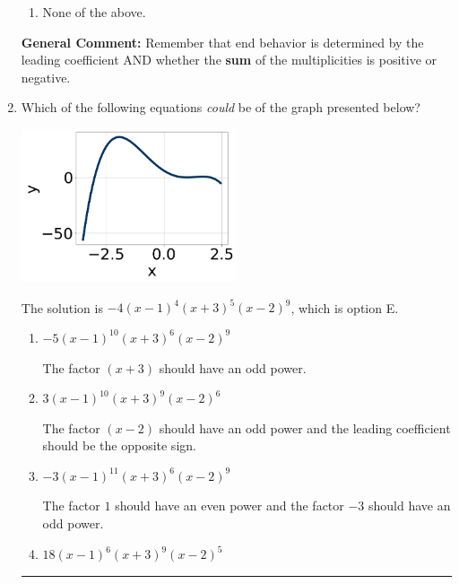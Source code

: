 \documentclass{extbook}[14pt]
\newcommand{\litem}[1]{\item #1

\rule{\textwidth}{0.4pt}}
\begin{document}
\begin{enumerate}
{\begin{enumerate}[label=\Alph*.]
\item None of the above.\end{enumerate}
\textbf{General Comment:} Remember that end behavior is determined by the leading coefficient AND whether the \textbf{sum} of the multiplicities is positive or negative.
}
\litem{
Which of the following equations \textit{could} be of the graph presented below?

\begin{center}
    \includegraphics[width=0.5\textwidth]{../Figures/polyGraphToFunctionCopyB.png}
\end{center}


The solution is \( -4(x - 1)^{4} (x + 3)^{5} (x - 2)^{9} \), which is option E.\begin{enumerate}[label=\Alph*.]
\item \( -5(x - 1)^{10} (x + 3)^{6} (x - 2)^{9} \)

The factor $(x + 3)$ should have an odd power.
\item \( 3(x - 1)^{10} (x + 3)^{9} (x - 2)^{6} \)

The factor $(x - 2)$ should have an odd power and the leading coefficient should be the opposite sign.
\item \( -3(x - 1)^{11} (x + 3)^{6} (x - 2)^{9} \)

The factor $1$ should have an even power and the factor $-3$ should have an odd power.
\item \( 18(x - 1)^{6} (x + 3)^{9} (x - 2)^{5} \)


\end{enumerate}}
\end{enumerate}
\end{document}
